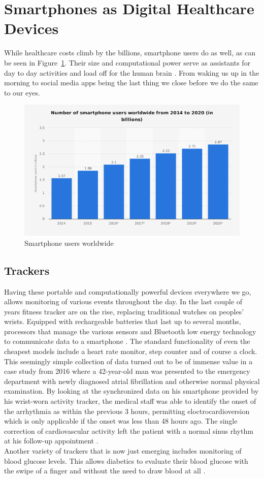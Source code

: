 \section{Smartphones as Digital Healthcare Devices}
While healthcare costs climb by the billions, smartphone users do as well, as can be seen in Figure~\ref{fig:graphical_statistics_of_smartphone_users}. Their size and computational power serve as assistants for day to day activities and load off for the human brain \cite{barr2015brain}. From waking us up in the morning to social media apps being the last thing we close before we do the same to our eyes.
\begin{figure}[htpb]
    \centering
    \includegraphics[width=0.8\linewidth]{media/Graphical-statistics-of-smartphone-users.png}
    \caption{Smartphone users worldwide \cite{numSmartphones}}%
    \label{fig:graphical_statistics_of_smartphone_users}
\end{figure}
\label{sec:smartphoneChances}
\subsection{Trackers}
Having these portable and computationally powerful devices everywhere we go, allows monitoring of various events throughout the day. In the last couple of years fitness tracker are on the rise, replacing traditional watches on peoples' wrists. Equipped with rechargeable batteries that last up to several months, processors that manage the various sensors and Bluetooth low energy technology to communicate data to a smartphone \cite{trackerDef}. The standard functionality of even the cheapest models include a heart rate monitor, step counter and of course a clock. This seemingly simple collection of data turned out to be of immense value in a case study from 2016 where a 42-year-old man was presented to the emergency department with newly diagnosed atrial fibrillation and otherwise normal physical examination. By looking at the synchronized data on his smartphone provided by his wrist-worn activity tracker, the medical staff was able to identify the onset of the arrhythmia as within the previous 3 hours, permitting eloctrocardioversion which is only applicable if the onset was less than 48 hours ago. The single correction of cardiovascular activity left the patient with a normal sinus rhythm at his follow-up appointment \cite{rudner2016interrogation}. \\
Another variety of trackers that is now just emerging includes monitoring of blood glucose levels. This allows diabetics to evaluate their blood glucose with the swipe of a finger and without the need to draw blood at all \cite{glucoseTracker}.
